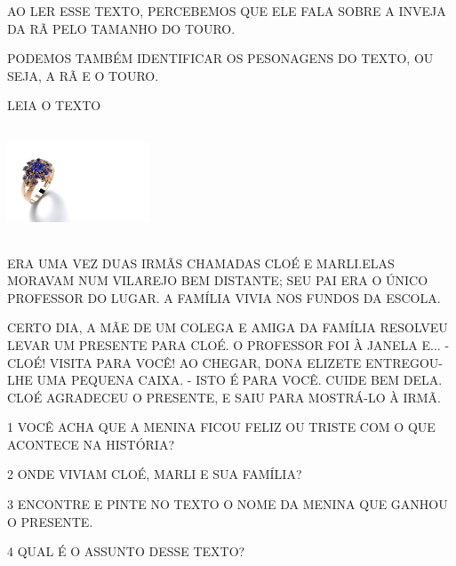 {%


AO LER ESSE TEXTO, PERCEBEMOS QUE ELE FALA SOBRE A INVEJA DA RÃ
PELO TAMANHO DO TOURO.

PODEMOS TAMBÉM IDENTIFICAR OS PESONAGENS DO TEXTO, OU SEJA, A RÃ E O TOURO.
}

LEIA O TEXTO

\includegraphics[width=1.66667in,height=1.30208in]{media/image163.jpg}

ERA UMA VEZ DUAS IRMÃS CHAMADAS CLOÉ E MARLI.ELAS MORAVAM NUM VILAREJO
BEM DISTANTE; SEU PAI ERA O ÚNICO PROFESSOR DO LUGAR. A FAMÍLIA VIVIA
NOS FUNDOS DA ESCOLA.

CERTO DIA, A MÃE DE UM COLEGA E AMIGA DA FAMÍLIA RESOLVEU LEVAR UM
PRESENTE PARA CLOÉ. O PROFESSOR FOI À JANELA E... - CLOÉ! VISITA PARA
VOCÊ! AO CHEGAR, DONA ELIZETE ENTREGOU-LHE UMA PEQUENA CAIXA. - ISTO É
PARA VOCÊ. CUIDE BEM DELA. CLOÉ AGRADECEU O PRESENTE, E SAIU PARA
MOSTRÁ-LO À IRMÃ.


\num{1} VOCÊ ACHA QUE A MENINA FICOU FELIZ OU TRISTE COM O QUE ACONTECE NA HISTÓRIA?


\num{2} ONDE VIVIAM CLOÉ, MARLI E SUA FAMÍLIA?


\num{3} ENCONTRE E PINTE NO TEXTO O NOME DA MENINA QUE GANHOU O PRESENTE.

\num{4} QUAL É O ASSUNTO DESSE TEXTO?

